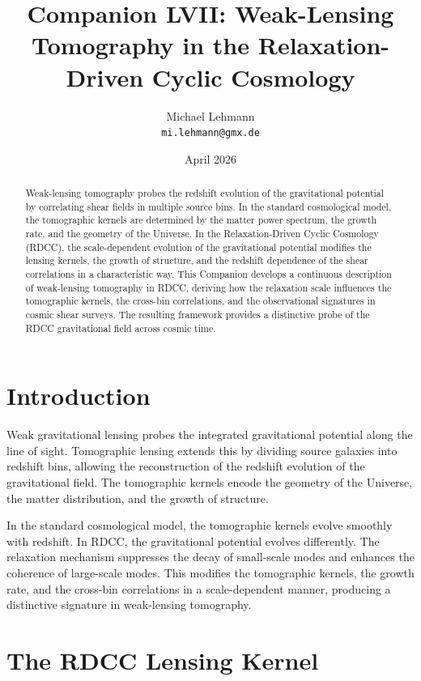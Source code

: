 \documentclass[11pt,a4paper]{article}
\title{\textbf{Companion LVII: Weak-Lensing Tomography in the Relaxation-Driven Cyclic Cosmology}}
\author{Michael Lehmann \\ \texttt{mi.lehmann@gmx.de}}
\date{April 2026}
\begin{document}
\maketitle

\begin{abstract}
Weak-lensing tomography probes the redshift evolution of the gravitational 
potential by correlating shear fields in multiple source bins. In the standard 
cosmological model, the tomographic kernels are determined by the matter power 
spectrum, the growth rate, and the geometry of the Universe. In the 
Relaxation-Driven Cyclic Cosmology (RDCC), the scale-dependent evolution of the 
gravitational potential modifies the lensing kernels, the growth of structure, and 
the redshift dependence of the shear correlations in a characteristic way. This 
Companion develops a continuous description of weak-lensing tomography in RDCC, 
deriving how the relaxation scale influences the tomographic kernels, the 
cross-bin correlations, and the observational signatures in cosmic shear surveys. 
The resulting framework provides a distinctive probe of the RDCC gravitational 
field across cosmic time.
\end{abstract}
\section{Introduction}

Weak gravitational lensing probes the integrated gravitational potential along the 
line of sight. Tomographic lensing extends this by dividing source galaxies into 
redshift bins, allowing the reconstruction of the redshift evolution of the 
gravitational field. The tomographic kernels encode the geometry of the Universe, 
the matter distribution, and the growth of structure.

In the standard cosmological model, the tomographic kernels evolve smoothly with 
redshift. In RDCC, the gravitational potential evolves differently. The relaxation 
mechanism suppresses the decay of small-scale modes and enhances the coherence of 
large-scale modes. This modifies the tomographic kernels, the growth rate, and the 
cross-bin correlations in a scale-dependent manner, producing a distinctive 
signature in weak-lensing tomography.
\section{The RDCC Lensing Kernel}
\end{document}
